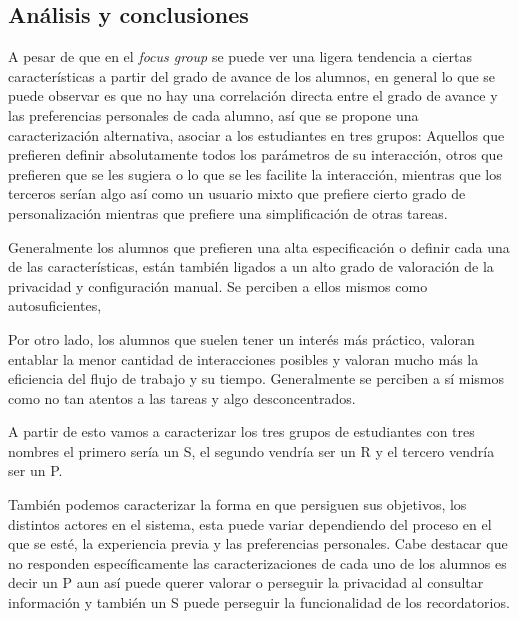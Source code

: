 \subsection{Análisis y conclusiones}
    \par A pesar de que en el \textit{focus group} se puede ver una ligera tendencia a ciertas características a partir del grado de avance de los alumnos, en general lo que se puede observar es que no hay una correlación directa entre el grado de avance y las preferencias personales de cada alumno, así que se propone una caracterización alternativa, asociar a los estudiantes en tres grupos: Aquellos que prefieren definir absolutamente todos los parámetros de su interacción, otros que prefieren que se les sugiera o lo que se les facilite la interacción, mientras que los terceros serían algo así como un usuario mixto que prefiere cierto grado de personalización mientras que prefiere una simplificación de otras tareas.
    \par Generalmente los alumnos que prefieren una alta especificación o definir cada una de las características, están también ligados a un alto grado de valoración de la privacidad y configuración manual. Se perciben a ellos mismos como autosuficientes,
    \par Por otro lado, los alumnos que suelen tener un interés más práctico, valoran entablar la menor cantidad de interacciones posibles y valoran mucho más la eficiencia del flujo de trabajo y su tiempo. Generalmente se perciben a sí mismos como no tan atentos a las tareas y algo desconcentrados.
    \par A partir de esto vamos a caracterizar los tres grupos de estudiantes con tres nombres el primero sería un \acrfull{S}, el segundo vendría ser un \acrfull{R} y el tercero vendría ser un \acrfull{P}.
    \par También podemos caracterizar la forma en que persiguen sus objetivos, los distintos actores en el sistema, esta puede variar dependiendo del proceso en el que se esté, la experiencia previa y las preferencias personales. Cabe destacar que no responden específicamente las caracterizaciones de cada uno de los alumnos es decir un \acrshort{P} aun así puede querer valorar o perseguir la privacidad al consultar información y también un \acrshort{S} puede perseguir la funcionalidad de los recordatorios.
